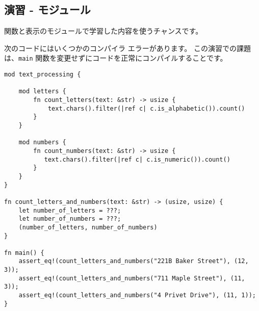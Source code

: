 \subsection{演習 - モジュール}

関数と表示のモジュールで学習した内容を使うチャンスです。

次のコードにはいくつかのコンパイラ エラーがあります。 この演習での課題は、\texttt{main} 関数を変更せずにコードを正常にコンパイルすることです。

\begin{lstlisting}[numbers=none]
mod text_processing {

    mod letters {
        fn count_letters(text: &str) -> usize {
            text.chars().filter(|ref c| c.is_alphabetic()).count()
        }
    }

    mod numbers {
        fn count_numbers(text: &str) -> usize {
           text.chars().filter(|ref c| c.is_numeric()).count()
        }
    }
}

fn count_letters_and_numbers(text: &str) -> (usize, usize) {
    let number_of_letters = ???;
    let number_of_numbers = ???;
    (number_of_letters, number_of_numbers)
}

fn main() {
    assert_eq!(count_letters_and_numbers("221B Baker Street"), (12, 3));
    assert_eq!(count_letters_and_numbers("711 Maple Street"), (11, 3));
    assert_eq!(count_letters_and_numbers("4 Privet Drive"), (11, 1));
}
\end{lstlisting}







